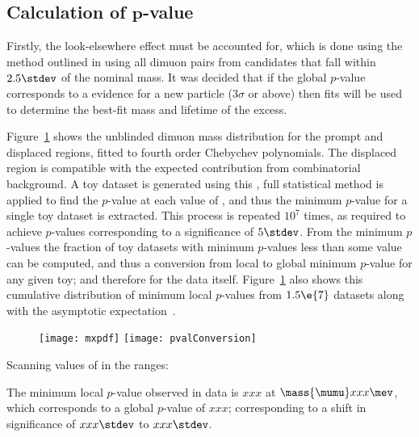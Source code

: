 \subsection[Calculation of $p$-value]
{Calculation of $\boldsymbol{p}$-value}


Firstly, the look-elsewhere effect must be accounted for, which
is done using the method outlined in  using all dimuon pairs from \Bd candidates
that fall within $2.5\stdev$ of the nominal \Bd mass.
It was decided that if the global $p$-value corresponds to a evidence for a new particle
($3\sigma$ or above) then fits will be used to
determine the best-fit mass and lifetime of the excess.

Figure~\ref{fig:db:mmumu} shows the unblinded dimuon mass distribution for the prompt and
displaced regions, fitted to fourth order Chebychev polynomials.
The displaced region is compatible with the expected contribution from combinatorial background.
A toy dataset is generated using this \PDF, full statistical method is applied to find the
$p$-value at each value of , and thus the minimum $p$-value for a single toy dataset is
extracted.
This process is repeated $10^7$ times, as required to achieve $p$-values corresponding to a
significance of $5\stdev$.
From the minimum $p$-values the fraction of toy datasets with minimum $p$-values less than some
value can be computed, and thus a conversion from local to global minimum $p$-value for any given
toy; and therefore for the data itself.
Figure~\ref{fig:db:mmumu} also shows this cumulative distribution of minimum local $p$-values from
$1.5\e{7}$ datasets along with the asymptotic expectation~\cite{Gross:2010qma}.

\begin{figure}
  \begin{center}
    \texttt{[image: mxpdf]}
    \texttt{[image: pvalConversion]}
    \caption[]
    {
    }
    \label{fig:db:mmumu}
  \end{center}
\end{figure}


Scanning values of  in the ranges:

The minimum local $p$-value observed in data is $xxx$  at $\mass{\mumu}xxx\mev$,
which corresponds to a global $p$-value of $xxx$; corresponding to a shift in significance of
$xxx\stdev$ to $xxx\stdev$.



